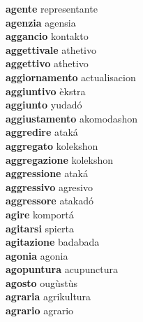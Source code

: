\textbf{agente } representante \\
\textbf{agenzia } agensia \\
\textbf{aggancio } kontakto \\
\textbf{aggettivale } athetivo \\
\textbf{aggettivo } athetivo \\
\textbf{aggiornamento } actualisacion \\
\textbf{aggiuntivo } èkstra \\
\textbf{aggiunto } yudadó \\
\textbf{aggiustamento } akomodashon \\
\textbf{aggredire } ataká \\
\textbf{aggregato } kolekshon \\
\textbf{aggregazione } kolekshon \\
\textbf{aggressione } ataká \\
\textbf{aggressivo } agresivo \\
\textbf{aggressore } atakadó \\
\textbf{agire } komportá \\
\textbf{agitarsi } spierta \\
\textbf{agitazione } badabada \\
\textbf{agonia } agonia \\
\textbf{agopuntura } acupunctura \\
\textbf{agosto } ougùstùs \\
\textbf{agraria } agrikultura \\
\textbf{agrario } agrario \\
